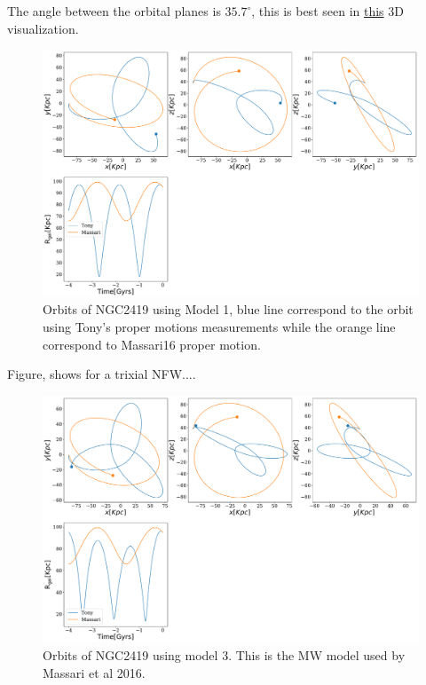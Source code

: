 \documentclass[14pt]{article}
\begin{document}
The angle between the orbital planes is $35.7^{\circ}$, this is best seen in
\href{https://plot.ly/~jngc/3/orbits/?share_key=FcyuVOnd0LYVXaYhGmSuo9}{this}
3D visualization.


\begin{figure}[H]
\centering
\includegraphics[scale=0.3]{../exploratory_code/NGC2419_sphMW.pdf}
\caption{Orbits of NGC2419 using Model 1, blue line correspond to
the orbit using Tony's proper motions measurements while the orange line correspond to
Massari16 proper motion.\label{fig:model1MW}}
\end{figure}

Figure, shows for a trixial NFW....

\begin{figure}[H]
\centering
\includegraphics[scale=0.3]{../exploratory_code/NGC2419_Triaxial_MW.pdf}
\caption{Orbits of NGC2419 using model 3. This is the MW model used by
Massari et al 2016.}
\end{figure}
\end{document}
